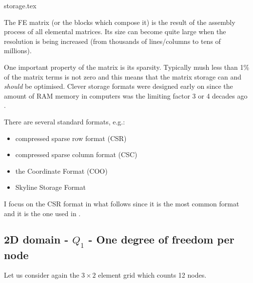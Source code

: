 \begin{flushright} {\tiny {\color{gray} storage.tex}} \end{flushright}

The FE matrix (or the blocks which compose it) 
is the result of the assembly process of all elemental matrices. 
Its size can become quite large when the resolution is being increased (from thousands
of lines/columns to tens of millions).

One important property of the matrix is its sparsity. Typically mush less than 1\% of the 
matrix terms is not zero and this means that the matrix storage can and {\it should} be optimised. 
Clever storage formats were designed early on since the amount of RAM memory in computers
was the limiting factor 3 or 4 decades ago \cite{saad}.

There are several standard formats, e.g.:
\begin{itemize}
\item compressed sparse row format (CSR)  
\item compressed sparse column format (CSC)  
\item the Coordinate Format (COO)
\item Skyline Storage Format
\end{itemize}

I focus on  the CSR format in what follows since it is the most common format 
and it is the one used in \elefant. 

\subsection{2D domain - $Q_1$ - One degree of freedom per node}

Let us consider again the  $3\times2$ element grid which counts 12 nodes.

\begin{center}

\end{center}

